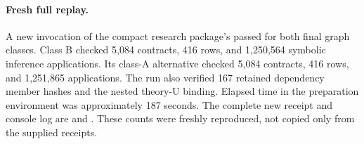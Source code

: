 \paragraph{Fresh full replay.} A new invocation of the compact research package's  passed for both final graph classes. Class B checked 5,084 contracts, 416 rows, and 1,250,564 symbolic inference applications. Its class-A alternative checked 5,084 contracts, 416 rows, and 1,251,865 applications. The run also verified 167 retained dependency member hashes and the nested theory-U binding. Elapsed time in the preparation environment was approximately 187 seconds. The complete new receipt and console log are  and . These counts were freshly reproduced, not copied only from the supplied receipts.
